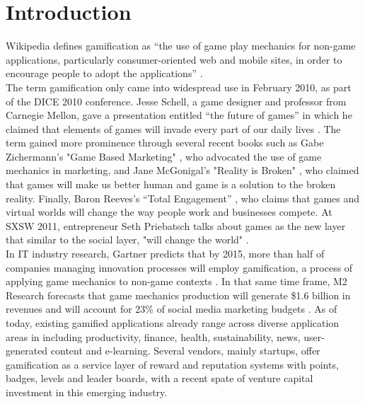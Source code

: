 \chapter{Introduction}

Wikipedia defines gamification as ``the use of game play mechanics for non-game applications, particularly consumer-oriented web and mobile sites, in order to encourage people to adopt the applications'' \cite {Wikipedia}. \\

The term gamification only came into widespread use in February 2010, as part of the DICE 2010 conference. Jesse Schell, a game designer and professor from Carnegie Mellon, gave a presentation entitled ``the future of games'' in which he claimed that elements of games will invade every part of our daily lives \cite {schell2010design}. The term gained more prominence through several recent books such as Gabe Zichermann's "Game Based Marketing" \cite {zichermann2010game}, who advocated the use of game mechanics in marketing, and Jane McGonigal's "Reality is Broken" \cite {mcgonigal2011reality}, who claimed  that games will make us better human and game is a solution to the broken reality. Finally, Baron Reeves's ``Total Engagement'' \cite {reeves2009total}, who claims that games and virtual worlds will change the way people work and businesses compete. At SXSW 2011, entrepreneur Seth Priebatsch talks about games as the new layer that similar to the social layer, "will change the world" \cite {Priebatsch2010ted}. \\

In IT industry research, Gartner predicts that by 2015, more than half of companies managing innovation processes will employ gamification, a process of applying game mechanics to non-game contexts \cite {gartnerPress2011}. In that same time frame, M2 Research forecasts that game mechanics production will generate \$1.6 billion in revenues and will account for 23\% of social media marketing budgets \cite {M2Research2011}. As of today, existing gamified applications already range across diverse application areas in including productivity, finance, health, sustainability, news, user-generated content and e-learning. Several vendors, mainly startups, offer gamification as a service layer of reward and reputation systems with points, badges, levels and leader boards, with a recent spate of venture capital investment in this emerging industry.\\

